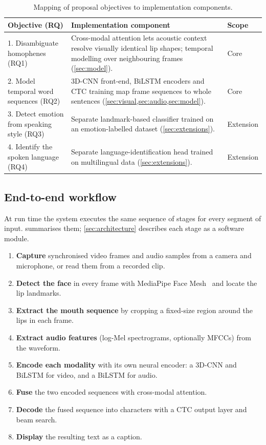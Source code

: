 \begin{table}[H]
\centering
\caption{Mapping of proposal objectives to implementation components.}
\label{tab:objectives}
\small
\begin{tabularx}{\textwidth}{@{}p{3.4cm}X p{1.9cm}@{}}
\toprule
\textbf{Objective (RQ)} & \textbf{Implementation component} & \textbf{Scope} \\
\midrule
1. Disambiguate homophenes (RQ1) &
Cross-modal attention lets acoustic context resolve visually identical lip
shapes; temporal modelling over neighbouring frames (\cref{sec:model}). &
Core \\
2. Model temporal word sequences (RQ2) &
3D-CNN front-end, BiLSTM encoders and CTC training map frame sequences to
whole sentences (\cref{sec:visual,sec:audio,sec:model}). &
Core \\
3. Detect emotion from speaking style (RQ3) &
Separate landmark-based classifier trained on an emotion-labelled dataset
(\cref{sec:extensions}). &
Extension \\
4. Identify the spoken language (RQ4) &
Separate language-identification head trained on multilingual data
(\cref{sec:extensions}). &
Extension \\
\bottomrule
\end{tabularx}
\end{table}

\subsection{End-to-end workflow}
At run time the system executes the same sequence of stages for every segment
of input.  summarises them; \cref{sec:architecture}
describes each stage as a software module.

\begin{enumerate}
  \item \textbf{Capture} synchronised video frames and audio samples from a
        camera and microphone, or read them from a recorded clip.
  \item \textbf{Detect the face} in every frame with MediaPipe Face
        Mesh~\cite{kartynnik2019,lugaresi2019} and locate the lip landmarks.
  \item \textbf{Extract the mouth sequence} by cropping a fixed-size region
        around the lips in each frame.
  \item \textbf{Extract audio features} (log-Mel spectrograms, optionally MFCCs)
        from the waveform.
  \item \textbf{Encode each modality} with its own neural encoder: a 3D-CNN and
        BiLSTM for video, and a BiLSTM for audio.
  \item \textbf{Fuse} the two encoded sequences with cross-modal attention.
  \item \textbf{Decode} the fused sequence into characters with a CTC output
        layer and beam search.
  \item \textbf{Display} the resulting text as a caption.
\end{enumerate}

